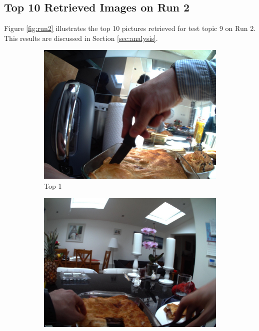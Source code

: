 \newpage
\subsection{Top 10 Retrieved Images on Run 2}
\label{sec:run2_retrieved}
Figure \ref{fig:run2} illustrates the top 10 pictures retrieved for test topic 9 on Run 2. This results are discussed in Section \ref{sec:analysis}.\\


\begin{figure}[H]
    \centering
    \captionsetup{justification=centering}
  
        \begin{subfigure}{0.32\textwidth}
          \includegraphics[width=\textwidth]{Sections/7Results/images/run2top1.jpg} 
          \caption{Top 1}
        \end{subfigure}
        \begin{subfigure}{0.32\textwidth}
          \includegraphics[width=\textwidth]{Sections/7Results/images/run3top2.jpg}\hfill

\end{subfigure}
\end{figure}
